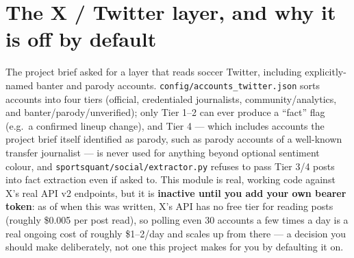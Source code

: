 \documentclass[11pt]{article}
\begin{document}
\section{The X / Twitter layer, and why it is off by default}
The project brief asked for a layer that reads soccer Twitter, including explicitly-named
banter and parody accounts. \texttt{config/accounts\_twitter.json} sorts accounts into four tiers
(official, credentialed journalists, community/analytics, and banter/parody/unverified); only
Tier 1--2 can ever produce a ``fact'' flag (e.g.\ a confirmed lineup change), and Tier 4 --- which
includes accounts the project brief itself identified as parody, such as parody accounts of a
well-known transfer journalist --- is never used for anything beyond optional sentiment colour,
and \texttt{sportsquant/social/extractor.py} refuses to pass Tier 3/4 posts into fact extraction
even if asked to. This module is real, working code against X's real API v2 endpoints, but it is
\textbf{inactive until you add your own bearer token}: as of when this was written, X's API has no
free tier for reading posts (roughly \$0.005 per post read), so polling even 30 accounts a few
times a day is a real ongoing cost of roughly \$1--2/day and scales up from there --- a decision
you should make deliberately, not one this project makes for you by defaulting it on.
\end{document}
